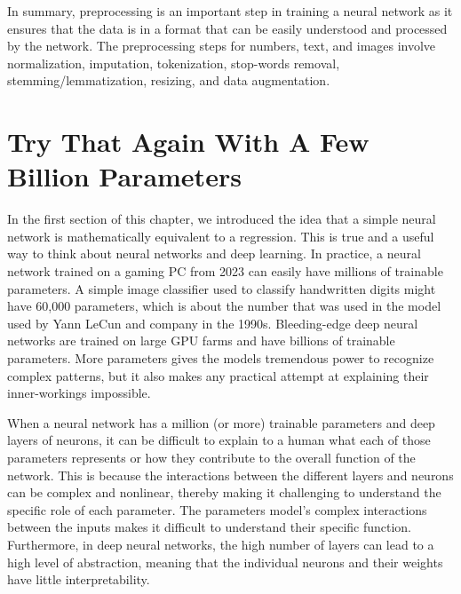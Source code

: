 In summary, preprocessing is an important step in training a neural network as it ensures that the data is in a format that can be easily understood and processed by the network. The preprocessing steps for numbers, text, and images involve normalization, imputation, tokenization, stop-words removal, stemming/lemmatization, resizing, and data augmentation.

\section{Try That Again With A Few Billion Parameters}

In the first section of this chapter, we introduced the idea that a simple neural network is mathematically equivalent to a regression. This is true and a useful way to think about neural networks and deep learning. In practice, a neural network trained on a gaming PC from 2023 can easily have millions of trainable parameters. A simple image classifier used to classify handwritten digits might have 60,000 parameters, which is about the number that was used in the model used by Yann LeCun and company in the 1990s. Bleeding-edge deep neural networks are trained on large GPU farms and have billions of trainable parameters. More parameters gives the models tremendous power to recognize complex patterns, but it also makes any practical attempt at explaining their inner-workings impossible.

When a neural network has a million (or more) trainable parameters and deep layers of neurons, it can be difficult to explain to a human what each of those parameters represents or how they contribute to the overall function of the network. This is because the interactions between the different layers and neurons can be complex and nonlinear, thereby making it challenging to understand the specific role of each parameter. The parameters model’s complex interactions between the inputs makes it difficult to understand their specific function. Furthermore, in deep neural networks, the high number of layers can lead to a high level of abstraction, meaning that the individual neurons and their weights have little interpretability.

